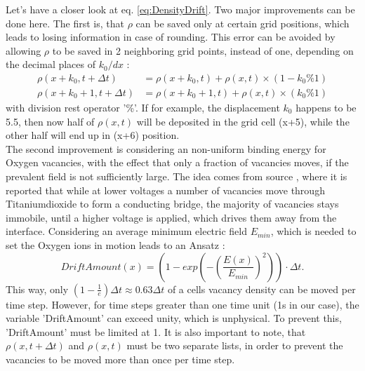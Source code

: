 \documentclass[12pt]{article}
\begin{document}
		Let's have a closer look at eq. \ref{eq:DensityDrift}. Two major improvements can be done here. The first is, that $\rho$ can be saved only at certain grid positions, which leads to losing information in case of rounding. This error can be avoided by allowing $\rho$ to be saved in 2 neighboring grid points, instead of one, depending on the decimal places of $k_0/dx$ :
		\begin{align*}
		\rho(x + k_0, t + \Delta t) &= \rho(x + k_0, t) + \rho(x, t) \times (1 - k_0\% 1)										\\
		\rho(x + k_0 + 1, t + \Delta t) &= \rho(x + k_0 + 1, t) + \rho(x, t) \times (k_0\% 1)
		\end{align*}
		with division rest operator '\%'. If for example, the displacement $k_0$ happens to be 5.5, then now half of $\rho(x, t)$ will be deposited in the grid cell (x+5), while the other half will end up in (x+6) position. \\
		The second improvement is considering an non-uniform binding energy for Oxygen vacancies, with the effect that only a fraction of vacancies moves, if the prevalent field is not sufficiently large. The idea comes from source \cite{Effect}, where it is reported that while at lower voltages a number of vacancies move through Titaniumdioxide to form a conducting bridge, the majority of vacancies stays immobile, until a higher voltage is applied, which drives them away from the interface.
		Considering an average minimum electric field $E_{min}$, which is needed to set the Oxygen ions in motion leads to an Ansatz :
		\begin{equation}
		DriftAmount(x) = \left(1 - exp\left(-(\frac{E(x)}{E_{min}})^2\right)\right) \cdot \Delta t.
		\end{equation}
		This way, only \((1-\frac{1}{e})\Delta t \approx 0.63 \Delta t \) of a cells vacancy density can be moved per time step.
		However, for time steps greater than one time unit (1s in our case), the variable 'DriftAmount' can exceed unity, which is unphysical. To prevent this, 'DriftAmount' must be limited at 1.
		It is also important to note, that $\rho(x, t + \Delta t)$ and $\rho(x, t)$ must be two separate lists, in order to prevent the vacancies to be moved more than once per time step.
	
\end{document}
